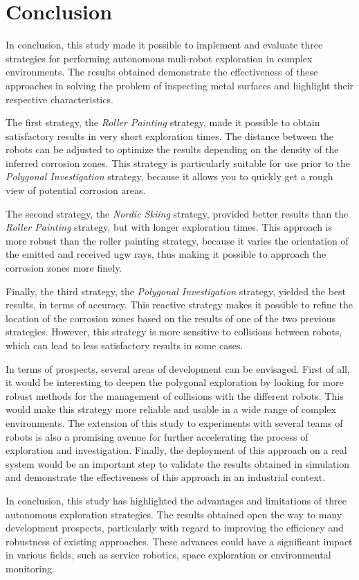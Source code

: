 
\chapter{Conclusion}

In conclusion, this study made it possible to implement and evaluate three strategies for performing autonomous muli-robot exploration in complex environments.
The results obtained demonstrate the effectiveness of these approaches in solving the problem of inspecting metal surfaces and highlight their respective characteristics.

The first strategy, the \textit{Roller Painting} strategy, made it possible to obtain satisfactory results in very short exploration times.
The distance between the robots can be adjusted to optimize the results depending on the density of the inferred corrosion zones.
This strategy is particularly suitable for use prior to the \textit{Polygonal Investigation} strategy, because it allows you to quickly get a rough view of potential corrosion areas.

The second strategy, the \textit{Nordic Skiing} strategy, provided better results than the \textit{Roller Painting} strategy, but with longer exploration times.
This approach is more robust than the roller painting strategy, because it varies the orientation of the emitted and received \gls{ugw} rays, thus making it possible to approach the corrosion zones more finely.

Finally, the third strategy, the \textit{Polygonal Investigation} strategy, yielded the best results, in terms of accuracy.
This reactive strategy makes it possible to refine the location of the corrosion zones based on the results of one of the two previous strategies.
However, this strategy is more sensitive to collisions between robots, which can lead to less satisfactory results in some cases.

In terms of prospects, several areas of development can be envisaged.
First of all, it would be interesting to deepen the polygonal exploration by looking for more robust methods for the management of collisions with the different robots.
This would make this strategy more reliable and usable in a wide range of complex environments.
The extension of this study to experiments with several teams of robots is also a promising avenue for further accelerating the process of exploration and investigation.
Finally, the deployment of this approach on a real system would be an important step to validate the results obtained in simulation and demonstrate the effectiveness of this approach in an industrial context.

In conclusion, this study has highlighted the advantages and limitations of three autonomous exploration strategies. The results obtained open the way to many development prospects, particularly with regard to improving the efficiency and robustness of existing approaches. These advances could have a significant impact in various fields, such as service robotics, space exploration or environmental monitoring.


